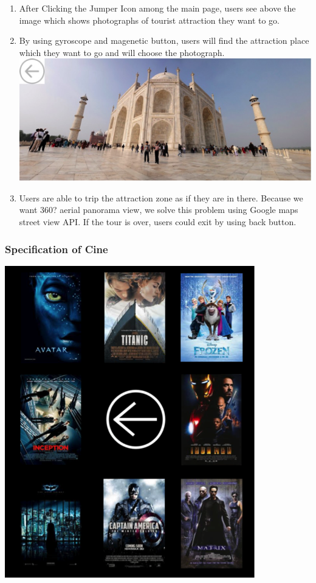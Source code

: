 \documentclass[12pt]{article}
\begin{document}
\begin{enumerate}
\item After Clicking the Jumper Icon among the main page, users see above the image which shows photographs of tourist attraction they want to go.   
\item By using gyroscope and magenetic button, users will find the attraction place which they want to go and will choose the photograph.\\
\includegraphics{View}
\item Users are able to trip the attraction zone as if they are in there. Because we want 360? aerial panorama view, we solve this problem using Google maps street view API. If the tour is over, users could exit by using back button.
\end{enumerate}

\subsubsection{Specification of Cine}
\includegraphics{Cine}
\end{document}
